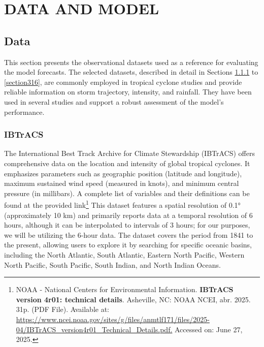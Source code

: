 \chapter{DATA AND MODEL}
\label{ch:data}

\section{Data}

This section presents the observational datasets used as a reference for evaluating the model forecasts. The selected datasets, described in detail in Sections \ref{section311} to \ref{section316}, are commonly employed in tropical cyclone studies and provide reliable information on storm trajectory, intensity, and rainfall. They have been used in several studies \cite{zhou2021regionalization, bopape2021sensitivity, mazza2023tropical, dulac2024assessing, yang2024evaluation, may2024cnn} and support a robust assessment of the model's performance.

\subsection{IBTrACS}
\label{section311}

The International Best Track Archive for Climate Stewardship (IBTrACS) \cite{knapp2010international} offers comprehensive data on the location and intensity of global tropical cyclones. It emphasizes parameters such as geographic position (latitude and longitude), maximum sustained wind speed (measured in knots), and minimum central pressure (in millibars). A complete list of variables and their definitions can be found at the provided link\footnote{NOAA - National Centers for Environmental Information. \textbf{IBTrACS version 4r01: technical details}. Asheville, NC: NOAA NCEI, abr. 2025. 31p. (PDF File). Available at: \url{https://www.ncei.noaa.gov/sites/g/files/anmtlf171/files/2025-04/IBTrACS_version4r01_Technical_Details.pdf.} Accessed on: June 27, 2025.}
This dataset features a spatial resolution of 0.1° (approximately 10 km) and primarily reports data at a temporal resolution of 6 hours, although it can be interpolated to intervals of 3 hours; for our purposes, we will be utilizing the 6-hour data. The dataset covers the period from 1841 to the present, allowing users to explore it by searching for specific oceanic basins, including the North Atlantic, South Atlantic, Eastern North Pacific, Western North Pacific, South Pacific, South Indian, and North Indian Oceans.


